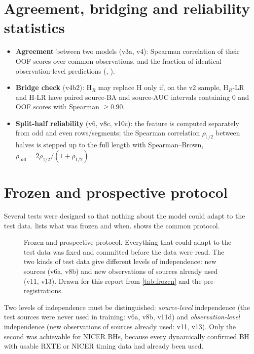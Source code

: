 \section{Agreement, bridging and reliability statistics}\label{sec:agreement}
\begin{itemize}
\item \textbf{Agreement} between two models (v3a, v4): Spearman correlation of their OOF scores over common observations,
and the fraction of identical observation-level predictions (, ).
\item \textbf{Bridge check} (v4b2): H$_R$ may replace H only if, on the v2 sample, H$_R$-LR and H-LR have paired source-BA and
source-AUC intervals containing 0 and OOF scores with Spearman $\ge0.90$.
\item \textbf{Split-half reliability} (v6, v8c, v10c): the feature is computed separately from odd and even rows/segments;
the Spearman correlation $\rho_{1/2}$ between halves is stepped up to the full length with Spearman--Brown,
$\rho_\mathrm{full}=2\rho_{1/2}/(1+\rho_{1/2})$.
\end{itemize}

\section{Frozen and prospective protocol}\label{sec:frozen}

Several tests were designed so that nothing about the model could adapt to the test data.  lists what
was frozen and when.  shows the common protocol.

\begin{figure}[htbp]
\centering

\caption[Frozen and prospective protocol]{Frozen and prospective protocol. Everything that could adapt to the test data was fixed
and committed before the data were read. The two kinds of test data give different levels of independence: new sources
(v6a, v8b) and new observations of sources already used (v11, v13). Drawn for this report from \cref{tab:frozen} and the
pre-registrations.}
\label{fig:frozenflow}
\end{figure}
 Two levels of independence must be distinguished: \emph{source-level} independence (the test
sources were never used in training: v6a, v8b, v11d) and \emph{observation-level} independence (new observations of
sources already used: v11, v13). Only the second was achievable for NICER BHs, because every dynamically confirmed BH with
usable RXTE or NICER timing data had already been used.

